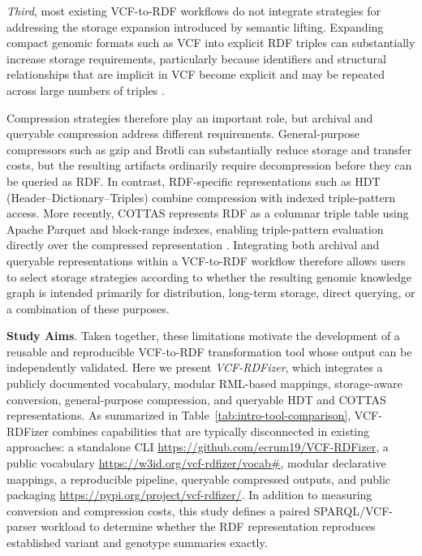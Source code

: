 \documentclass[pdflatex,sn-mathphys-num]{sn-jnl}%
\theoremstyle{thmstyleone}%
\theoremstyle{thmstyletwo}%
\theoremstyle{thmstylethree}%
\begin{document}
\textit{Third}, most existing VCF-to-RDF workflows do not integrate strategies for addressing the storage expansion introduced by semantic lifting.
Expanding compact genomic formats such as VCF into explicit RDF triples can substantially increase storage requirements, particularly because identifiers and structural relationships that are implicit in VCF become explicit and may be repeated across large numbers of triples \cite{rdf}.

Compression strategies therefore play an important role, but archival and queryable compression address different requirements.
General-purpose compressors such as gzip and Brotli \cite{brotli_2019} can substantially reduce storage and transfer costs, but the resulting artifacts ordinarily require decompression before they can be queried as RDF.
In contrast, RDF-specific representations such as HDT (Header--Dictionary--Triples) \cite{hdt_2013} combine compression with indexed triple-pattern access.
More recently, COTTAS represents RDF as a columnar triple table using Apache Parquet and block-range indexes, enabling triple-pattern evaluation directly over the compressed representation \cite{cottas_2025}.
Integrating both archival and queryable representations within a VCF-to-RDF workflow therefore allows users to select storage strategies according to whether the resulting genomic knowledge graph is intended primarily for distribution, long-term storage, direct querying, or a combination of these purposes.


\textbf{Study Aims}.
Taken together, these limitations motivate the development of a reusable and reproducible VCF-to-RDF transformation tool whose output can be independently validated. 
Here we present \textit{VCF-RDFizer}, which integrates a publicly documented vocabulary, modular RML-based mappings, storage-aware conversion, general-purpose compression, and queryable HDT and COTTAS representations.
As summarized in Table~\ref{tab:intro-tool-comparison}, VCF-RDFizer combines capabilities that are typically disconnected in existing approaches: a standalone CLI \url{https://github.com/ecrum19/VCF-RDFizer}, a public vocabulary \url{https://w3id.org/vcf-rdfizer/vocab\#}, modular declarative mappings, a reproducible pipeline, queryable compressed outputs, and public packaging \url{https://pypi.org/project/vcf-rdfizer/}. 
In addition to measuring conversion and compression costs, this study defines a paired SPARQL/VCF-parser workload to determine whether the RDF representation reproduces established variant and genotype summaries exactly.
\end{document}

